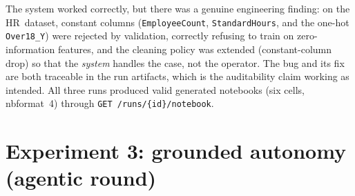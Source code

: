 \begin{table}[H]
\centering\footnotesize
\caption{Kaggle proof: three public datasets, end-to-end. Run identifiers refer to directories under \texttt{runs/}.}
\label{tab:kaggleproof}


\end{table}

The system worked correctly, but there was a genuine engineering finding: on the HR~\footnotemark[4]  dataset, constant columns (\texttt{EmployeeCount}, \texttt{StandardHours}, and the one-hot \texttt{Over18\_Y}) were rejected by validation, correctly refusing to train on zero-information features, and the cleaning policy was extended (constant-column drop) so that the \emph{system} handles the case, not the operator. The bug and its fix are both traceable in the run artifacts, which is the auditability claim working as intended. All three runs produced valid generated notebooks (six cells, nbformat~4) through \texttt{GET /runs/\{id\}/notebook}.


\section{Experiment 3: grounded autonomy (agentic round)}
\label{sec:exp-agentic-results}

